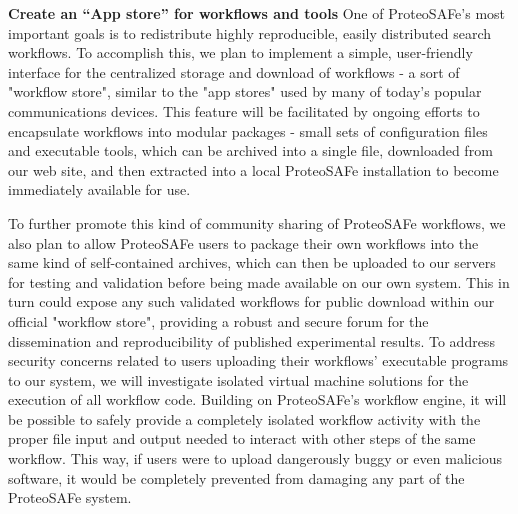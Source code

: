 \documentclass[arial,11pt]{article}
\begin{document}
{\bf Create an ``App store'' for workflows and tools}
One of ProteoSAFe's most important goals is to redistribute highly reproducible, easily distributed search workflows.  To accomplish this, we plan to implement a simple, user-friendly interface for the centralized storage and download of workflows - a sort of "workflow store", similar to the "app stores" used by many of today's popular communications devices.  This feature will be facilitated by ongoing efforts to encapsulate workflows into modular packages - small sets of configuration files and executable tools, which can be archived into a single file, downloaded from our web site, and then extracted into a local ProteoSAFe installation to become immediately available for use.

To further promote this kind of community sharing of ProteoSAFe workflows, we also plan to allow ProteoSAFe users to package their own workflows into the same kind of self-contained archives, which can then be uploaded to our servers for testing and validation before being made available on our own system. This in turn could expose any such validated workflows for public download within our official "workflow store", providing a robust and secure forum for the dissemination and reproducibility of published experimental results.
%
To address security concerns related to users uploading their workflows' executable programs to our system, we will investigate isolated virtual machine solutions for the execution of all workflow code.  Building on ProteoSAFe's workflow engine, it will be possible to safely provide a completely isolated workflow activity with the proper file input and output needed to interact with other steps of the same workflow.  This way, if users were to upload dangerously buggy or even malicious software, it would be completely prevented from damaging any part of the ProteoSAFe system.
\end{document}
